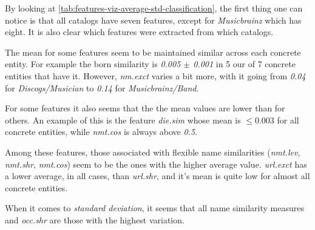 \documentclass[epsfig,a4paper,11pt,titlepage,twoside,openany]{book}
\begin{document}
By looking at \autoref{tab:features-viz-average-std-classification}, the first thing one can notice is that all catalogs have seven features, except for \textit{Musicbrainz} which has eight. It is also clear which features were extracted from which catalogs. 

The mean for some features seem to be maintained similar across each concrete entity. For example the born similarity is \textit{0.005 $\pm$ 0.001} in 5 our of 7 concrete entities that have it. However, \textit{nm.exct} varies a bit more, with it going from \textit{0.04} for \textit{Discogs/Musician} to \textit{0.14} for \textit{Musicbrainz/Band}. 

For some features it also seems that the the mean values are lower than for others. An example of this is the feature \textit{die.sim} whose mean is $\leq 0.003$ for all concrete entities, while \textit{nmt.cos} is always above \textit{0.5}. 

Among these features, those associated with flexible name similarities (\textit{nmt.lev}, \textit{nmt.shr}, \textit{nmt.cos}) seem to be the ones with the higher average value. \textit{url.exct} has a lower average, in all cases, than \textit{url.shr}, and it's mean is quite low for almost all concrete entities. 

When it comes to \textit{standard deviation}, it seems that all name similarity measures and \textit{occ.shr} are those with the highest variation. 
\end{document}
